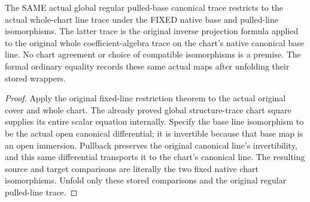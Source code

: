 \begin{lemma}
\label{lem:kn-regular-pulled-canonical-fixed-chart-restriction}
\leanok
The SAME actual global regular pulled-base canonical trace restricts to the
actual whole-chart line trace under the FIXED native base and pulled-line
isomorphisms. The latter trace is the original inverse projection formula
applied to the original whole coefficient-algebra trace on the chart's native
canonical base line. No chart agreement or choice of compatible isomorphisms
is a premise. The formal ordinary equality records these same actual maps
after unfolding their stored wrappers.
\end{lemma}
\begin{proof}
Apply the original fixed-line restriction theorem to the actual original
cover and whole chart. The already proved global structure-trace chart square
supplies its entire scalar equation internally. Specify the base line
isomorphism to be the actual open canonical differential; it is invertible
because that base map is an open immersion. Pullback preserves the original
canonical line's invertibility, and this same differential transports it to
the chart's canonical line. The resulting source and target comparisons are
literally the two fixed native chart isomorphisms. Unfold only these stored
comparisons and the original regular pulled-line trace.
\end{proof}
